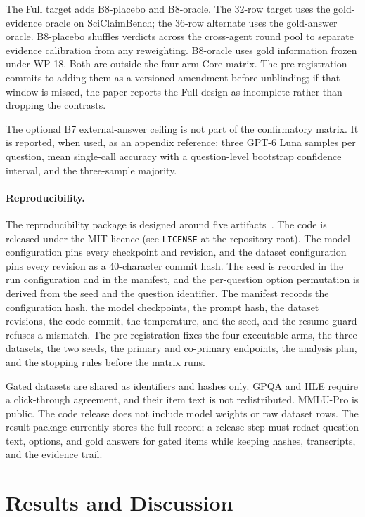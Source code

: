 The Full target adds B8-placebo and B8-oracle. The 32-row target uses the gold-evidence oracle on SciClaimBench; the 36-row alternate uses the gold-answer oracle. B8-placebo shuffles verdicts across the cross-agent round pool to separate evidence calibration from any reweighting. B8-oracle uses gold information frozen under WP-18. Both are outside the four-arm Core matrix. The pre-registration commits to adding them as a versioned amendment before unblinding; if that window is missed, the paper reports the Full design as incomplete rather than dropping the contrasts.

The optional B7 external-answer ceiling is not part of the confirmatory matrix. It is reported, when used, as an appendix reference: three GPT-6 Luna samples per question, mean single-call accuracy with a question-level bootstrap confidence interval, and the three-sample majority.

\paragraph*{Reproducibility.}
The reproducibility package is designed around five artifacts~\cite{pineau2021improving}. The code is released under the MIT licence (see \texttt{LICENSE} at the repository root). The model configuration pins every checkpoint and revision, and the dataset configuration pins every revision as a 40-character commit hash. The seed is recorded in the run configuration and in the manifest, and the per-question option permutation is derived from the seed and the question identifier. The manifest records the configuration hash, the model checkpoints, the prompt hash, the dataset revisions, the code commit, the temperature, and the seed, and the resume guard refuses a mismatch. The pre-registration fixes the four executable arms, the three datasets, the two seeds, the primary and co-primary endpoints, the analysis plan, and the stopping rules before the matrix runs.

Gated datasets are shared as identifiers and hashes only. GPQA and HLE require a click-through agreement, and their item text is not redistributed. MMLU-Pro is public. The code release does not include model weights or raw dataset rows. The result package currently stores the full record; a release step must redact question text, options, and gold answers for gated items while keeping hashes, transcripts, and the evidence trail.

\section{Results and Discussion}\label{sec:results-discussion}

